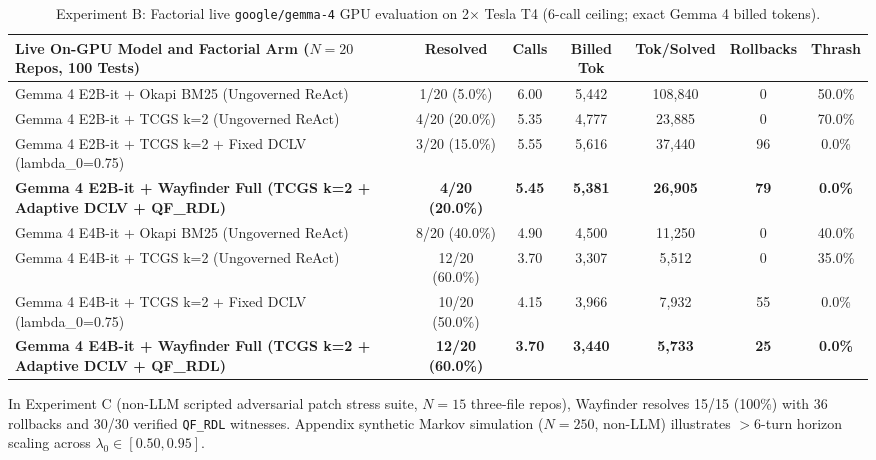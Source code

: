 \documentclass[10pt,twocolumn]{article}
\begin{document}
\begin{table}[t]
\centering
\scriptsize
\begin{tabular}{lcccccc}
\toprule
\textbf{Live On-GPU Model and Factorial Arm ($N=20$ Repos, 100 Tests)} & \textbf{Resolved} & \textbf{Calls} & \textbf{Billed Tok} & \textbf{Tok/Solved} & \textbf{Rollbacks} & \textbf{Thrash} \\
\midrule
Gemma 4 E2B-it + Okapi BM25 (Ungoverned ReAct) & 1/20 (5.0\%) & 6.00 & 5,442 & 108,840 & 0 & 50.0\% \\
Gemma 4 E2B-it + TCGS k=2 (Ungoverned ReAct) & 4/20 (20.0\%) & 5.35 & 4,777 & 23,885 & 0 & 70.0\% \\
Gemma 4 E2B-it + TCGS k=2 + Fixed DCLV (lambda\_0=0.75) & 3/20 (15.0\%) & 5.55 & 5,616 & 37,440 & 96 & 0.0\% \\
\textbf{Gemma 4 E2B-it + Wayfinder Full (TCGS k=2 + Adaptive DCLV + QF\_RDL)} & \textbf{4/20 (20.0\%)} & \textbf{5.45} & \textbf{5,381} & \textbf{26,905} & \textbf{79} & \textbf{0.0\%} \\
Gemma 4 E4B-it + Okapi BM25 (Ungoverned ReAct) & 8/20 (40.0\%) & 4.90 & 4,500 & 11,250 & 0 & 40.0\% \\
Gemma 4 E4B-it + TCGS k=2 (Ungoverned ReAct) & 12/20 (60.0\%) & 3.70 & 3,307 & 5,512 & 0 & 35.0\% \\
Gemma 4 E4B-it + TCGS k=2 + Fixed DCLV (lambda\_0=0.75) & 10/20 (50.0\%) & 4.15 & 3,966 & 7,932 & 55 & 0.0\% \\
\textbf{Gemma 4 E4B-it + Wayfinder Full (TCGS k=2 + Adaptive DCLV + QF\_RDL)} & \textbf{12/20 (60.0\%)} & \textbf{3.70} & \textbf{3,440} & \textbf{5,733} & \textbf{25} & \textbf{0.0\%} \\
\bottomrule
\end{tabular}
\caption{Experiment B: Factorial live \texttt{google/gemma-4} GPU evaluation on 2$\times$ Tesla T4 (6-call ceiling; exact Gemma 4 billed tokens).}
\end{table}

In Experiment C (non-LLM scripted adversarial patch stress suite, $N=15$ three-file repos), Wayfinder resolves 15/15 (100\%) with 36 rollbacks and 30/30 verified \texttt{QF\_RDL} witnesses. Appendix synthetic Markov simulation ($N=250$, non-LLM) illustrates $>6$-turn horizon scaling across $\lambda_0 \in [0.50, 0.95]$.
\end{document}
